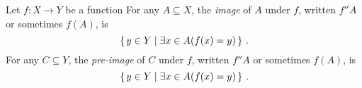 \guard





\begin{defn}
\label{defn:functionAppliedToSet}
  Let $f:X\to Y$ be a function
  For any $A\subseteq X$, the \emph{image} of $A$ under $f$, written $f''A$ or sometimes $f(A)$, is \[ \left\{\, y\in Y \mid \exists x\in A( f(x) = y )\,\right\}\,.\]
  For any $C\subseteq Y$, the \emph{pre-image} of $C$ under $f$, written $f''A$ or sometimes $f(A)$, is \[ \left\{\, y\in Y \mid \exists x\in A( f(x) = y )\,\right\}\,.\]
\end{defn}
